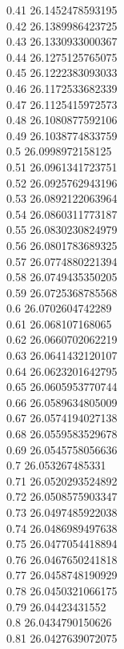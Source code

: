 {0.41	26.1452478593195\\
0.42	26.1389986423725\\
0.43	26.1330933000367\\
0.44	26.1275125765075\\
0.45	26.1222383093033\\
0.46	26.1172533682339\\
0.47	26.1125415972573\\
0.48	26.1080877592106\\
0.49	26.1038774833759\\
0.5	26.0998972158125\\
0.51	26.0961341723751\\
0.52	26.0925762943196\\
0.53	26.0892122063964\\
0.54	26.0860311773187\\
0.55	26.0830230824979\\
0.56	26.0801783689325\\
0.57	26.0774880221394\\
0.58	26.0749435350205\\
0.59	26.0725368785568\\
0.6	26.0702604742289\\
0.61	26.068107168065\\
0.62	26.0660702062219\\
0.63	26.0641432120107\\
0.64	26.0623201642795\\
0.65	26.0605953770744\\
0.66	26.0589634805009\\
0.67	26.0574194027138\\
0.68	26.0559583529678\\
0.69	26.0545758056636\\
0.7	26.053267485331\\
0.71	26.0520293524892\\
0.72	26.0508575903347\\
0.73	26.0497485922038\\
0.74	26.0486989497638\\
0.75	26.0477054418894\\
0.76	26.0467650241818\\
0.77	26.0458748190929\\
0.78	26.0450321066175\\
0.79	26.04423431552\\
0.8	26.0434790150626\\
0.81	26.0427639072075\\
}
